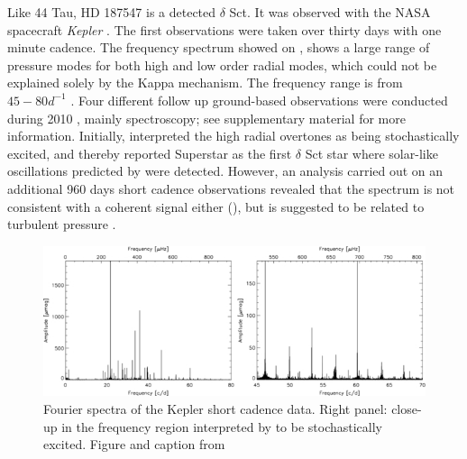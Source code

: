 Like 44 Tau, HD 187547 is a detected $\delta$ Sct. It was observed  with the NASA spacecraft \textit{Kepler} \citet{koch2010kepler}. The first observations were taken over thirty days with one minute cadence. The frequency spectrum showed on , shows a large range of pressure modes for both high and low order radial modes, which could not be explained solely by the Kappa mechanism. The frequency range is from $45-80 d^{-1}$ . Four different follow up ground-based observations were conducted during 2010 \citet{antoci2011excitation}, mainly spectroscopy; see \citet{antoci2011excitation} supplementary material for more information. Initially, \citet{antoci2011excitation} interpreted the high radial overtones as being stochastically excited, and thereby reported Superstar as the first $\delta$ Sct star where solar-like oscillations predicted by \citet{houdek1999, samadi2002} were detected.  However, an analysis carried out on an additional 960 days short cadence observations revealed that the spectrum is not consistent with a coherent signal either (), but is suggested to be related to turbulent pressure \citep{antoci2014role}. 

\begin{figure}[htbp]
    \centering
    \includegraphics[width=1\textwidth]{superstarspectrum.jpg}
    \caption{Fourier spectra of the Kepler short cadence data. Right panel: close-up in the frequency region interpreted by \citet{antoci2011solar} to be stochastically excited. Figure and caption from \citet{antoci2014role}}
    \label{ssspectrum}
\end{figure}

